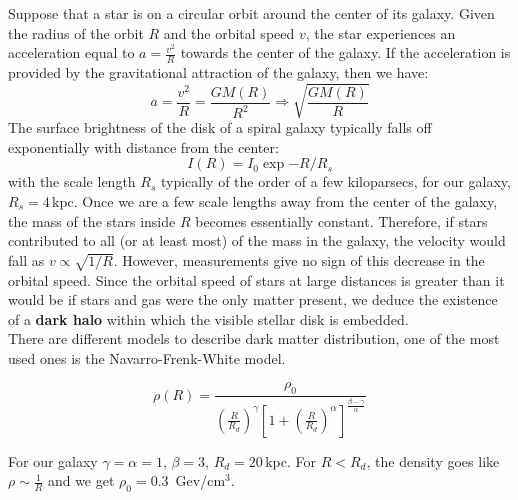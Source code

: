 \documentclass[10.75pt,a4paper,openright,bottom=2cm]{article}
\newcommand{\beginbox}[1]{\begin{tcolorbox}[width=\textwidth,colback={black!40},title={#1},colbacktitle={purple!55},coltitle=black]}
\renewcommand{\endbox}{\end{tcolorbox}\noindent}
\begin{document}
Suppose that a star is on a circular orbit around the center of its galaxy. Given the radius of the orbit $R$ and the orbital speed $v$, the star experiences an acceleration equal to $a=\frac{v^2}{R}$ towards the center of the galaxy. If the acceleration is provided by the gravitational attraction of the galaxy, then we have:
\[
a=\frac{v^2}{R}=\frac{GM(R)}{R^2}\Rightarrow\sqrt{\frac{GM(R)}{R}}
\]
The surface brightness of the disk of a spiral galaxy typically falls off exponentially with distance from the center:
\[
I(R)=I_0\exp{-R/R_s}
\]
with the scale length $R_s$ typically of the order of a few kiloparsecs, for our galaxy, $R_s=4$\,kpc. Once we are a few scale lengths away from the center of the galaxy, the mass of the stars inside $R$ becomes essentially constant. Therefore, if stars contributed to all (or at least most) of the mass in the galaxy, the velocity would fall as $v\propto\sqrt{1/R}$. However, measurements give no sign of this decrease in the orbital speed. Since the orbital speed of stars at large distances is greater than it would be if stars and gas were the only matter present, we deduce the existence of a \textbf{dark halo} within which the visible stellar disk is embedded.\\
There are different models to describe dark matter distribution, one of the most used ones is the Navarro-Frenk-White model.
\beginbox{Navarro-Frenk-White Model}
\[
\rho(R)=\frac{\rho_0}{\left(\frac{R}{R_d}\right)^\gamma\left[1+\left(\frac{R}{R_d}\right)^\alpha\right]^{\frac{\beta-\gamma}{\alpha}}}
\]
\endbox
For our galaxy $\gamma=\alpha=1$, $\beta=3$, $R_d=20$\,kpc. For $R<R_d$, the density goes like $\rho\sim\frac{1}{R}$ and we get $\rho_0=0.3$\, Gev/cm$^3$.\\
\end{document}
